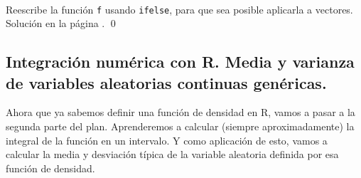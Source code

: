 \documentclass[10pt,a4paper]{article}\usepackage[]{graphicx}\usepackage[]{color}
\newcounter{cont01}
\begin{document}
\begin{ejercicio}
\label{tut05:ejercicio27}
\quad\\
Reescribe la función {\tt f} usando {\tt ifelse}, para que sea posible aplicarla a vectores.
Solución en la página \pageref{tut05:ejercicio27:sol}.
\qed
\end{ejercicio}



\subsection{Integración numérica con R. Media y varianza de variables aleatorias continuas genéricas. }
\label{tut05:subsec:IntegracionNumericaMediaVarianzaR}

Ahora que ya sabemos definir una función de densidad en R, vamos a pasar a la segunda parte del plan. Aprenderemos a calcular (siempre aproximadamente) la integral de la función en un intervalo. Y como aplicación de esto, vamos a calcular la media y desviación típica de la variable aleatoria definida por esa función de densidad.
\end{document}
